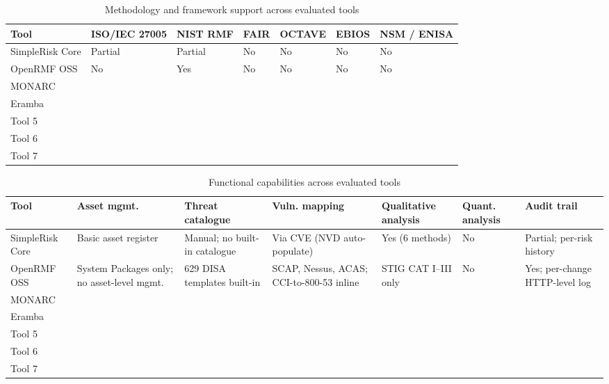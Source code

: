 \begin{table}[H]
\centering
\renewcommand{\arraystretch}{1.3}
\small
\caption{Methodology and framework support across evaluated tools}
\label{tab:comp-methodology}
\begin{tabular}{|p{2.8cm}|p{2cm}|p{2cm}|p{1.5cm}|p{1.5cm}|p{1.5cm}|p{1.5cm}|}
\hline
\textbf{Tool} & \textbf{ISO/IEC 27005} & \textbf{NIST RMF} & \textbf{FAIR} & \textbf{OCTAVE} & \textbf{EBIOS} & \textbf{NSM / ENISA} \\
\hline
SimpleRisk Core & Partial & Partial & No & No & No & No \\
\hline
OpenRMF OSS    & No      & Yes     & No & No & No & No \\
\hline
MONARC         & & & & & & \\
\hline
Eramba         & & & & & & \\
\hline
Tool 5         & & & & & & \\
\hline
Tool 6         & & & & & & \\
\hline
Tool 7         & & & & & & \\
\hline
\end{tabular}
\end{table}


\begin{table}[H]
\centering
\renewcommand{\arraystretch}{1.3}
\small
\caption{Functional capabilities across evaluated tools}
\label{tab:comp-functionality}
\begin{tabular}{|p{2.3cm}|p{2.2cm}|p{2.2cm}|p{2cm}|p{1.8cm}|p{1.5cm}|p{2cm}|}
\hline
\textbf{Tool} & \textbf{Asset mgmt.} & \textbf{Threat catalogue} & \textbf{Vuln. mapping} & \textbf{Qualitative analysis} & \textbf{Quant. analysis} & \textbf{Audit trail} \\
\hline
SimpleRisk Core & Basic asset register & Manual; no built-in catalogue & Via CVE (NVD auto-populate) & Yes (6 methods) & No & Partial; per-risk history \\
\hline
OpenRMF OSS    & System Packages only; no asset-level mgmt. & 629 DISA templates built-in & SCAP, Nessus, ACAS; CCI-to-800-53 inline & STIG CAT I--III only & No & Yes; per-change HTTP-level log \\
\hline
MONARC         & & & & & & \\
\hline
Eramba         & & & & & & \\
\hline
Tool 5         & & & & & & \\
\hline
Tool 6         & & & & & & \\
\hline
Tool 7         & & & & & & \\
\hline
\end{tabular}
\end{table}

